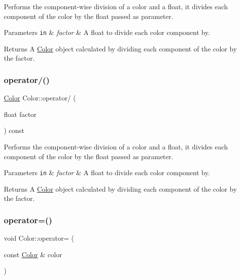 Performs the component-\/wise division of a color and a float, it divides each component of the color by the float passed as parameter. 


\begin{DoxyParams}[1]{Parameters}
\mbox{\tt in}  & {\em factor} & A float to divide each color component by.\\
\hline
\end{DoxyParams}
\begin{DoxyReturn}{Returns}
A \hyperlink{classColor}{Color} object calculated by dividing each component of the color by the factor. 
\end{DoxyReturn}
\mbox{\label{classColor_ac1591338c7f8714e3683cca15ffb2fd3}} 
\subsubsection{\texorpdfstring{operator/()}{operator/()}\hspace{0.1cm}{\footnotesize\ttfamily [2/2]}}
{\footnotesize\ttfamily \hyperlink{classColor}{Color} Color\+::operator/ (\begin{DoxyParamCaption}\item[{float}]{factor }\end{DoxyParamCaption}) const}



Performs the component-\/wise division of a color and a float, it divides each component of the color by the float passed as parameter. 


\begin{DoxyParams}[1]{Parameters}
\mbox{\tt in}  & {\em factor} & A float to divide each color component by.\\
\hline
\end{DoxyParams}
\begin{DoxyReturn}{Returns}
A \hyperlink{classColor}{Color} object calculated by dividing each component of the color by the factor. 
\end{DoxyReturn}
\mbox{\label{classColor_ac06dcf409ae64de5a67c7f6e69b6f44b}} 
\subsubsection{\texorpdfstring{operator=()}{operator=()}\hspace{0.1cm}{\footnotesize\ttfamily [1/2]}}
{\footnotesize\ttfamily void Color\+::operator= (\begin{DoxyParamCaption}\item[{const \hyperlink{classColor}{Color} \&}]{color }\end{DoxyParamCaption})}



